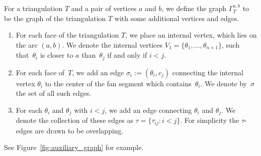 \documentclass[11pt]{article}
\numberwithin{equation}{section}
\numberwithin{equation}{section}
\begin{document}
For a triangulation $T$ and a pair of vertices $a$ and $b$, we define the graph $\Gamma_T^{a,b}$ to be the graph of the triangulation $T$ with some additional vertices and edges.
\begin{enumerate}\itemsep=0pt
 \item For each face of the triangulation $T$, we place an internal vertex, which lies on the arc $(a,b)$.
 We denote the internal vertices $V_1=\{\theta_1,\dots,\theta_{n+1}\}$, such that~$\theta_i$ is closer to $a$ than~$\theta_j$ if and only if $i<j$.

 \item For each face of~$T$, we add an edge $\sigma_i := (\theta_i, c_j)$ connecting the internal vertex $\theta_i$ to the center of the fan segment which contains~$\theta_i$.
 We denote by~$\sigma$ the set of all such edges.

 \item For each $\theta_i$ and $\theta_j$ with $i<j$, we add an edge connecting $\theta_i$ and $\theta_j$.
 We denote the collection of these edges as $\tau = \{\tau_{ij}\colon i<j\}$. For simplicity the $\tau$-edges are drawn to be overlapping.
\end{enumerate}
See Figure~\ref{fig:auxiliary_graph} for example.
\end{document}

